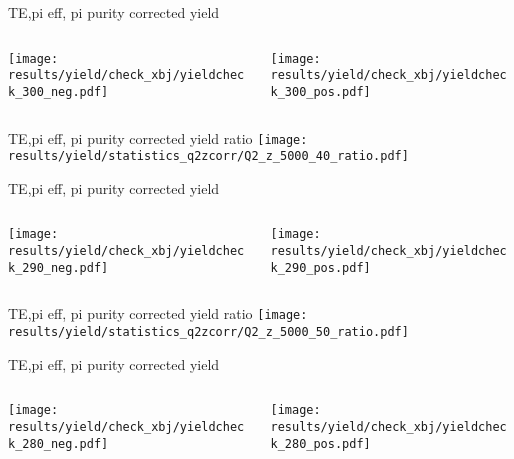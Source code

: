\begin{frame}{TE,pi eff, pi purity corrected yield}
\begin{columns}
\begin{column}[T]{0.5\textwidth}
\texttt{[image: results/yield/check\_xbj/yieldcheck\_300\_neg.pdf]}
\end{column}
\begin{column}[T]{0.5\textwidth}
\texttt{[image: results/yield/check\_xbj/yieldcheck\_300\_pos.pdf]}
\end{column}
\end{columns}
\end{frame}
\begin{frame}{TE,pi eff, pi purity corrected yield ratio}
\texttt{[image: results/yield/statistics\_q2zcorr/Q2\_z\_5000\_40\_ratio.pdf]}
\end{frame}
\begin{frame}{TE,pi eff, pi purity corrected yield}
\begin{columns}
\begin{column}[T]{0.5\textwidth}
\texttt{[image: results/yield/check\_xbj/yieldcheck\_290\_neg.pdf]}
\end{column}
\begin{column}[T]{0.5\textwidth}
\texttt{[image: results/yield/check\_xbj/yieldcheck\_290\_pos.pdf]}
\end{column}
\end{columns}
\end{frame}
\begin{frame}{TE,pi eff, pi purity corrected yield ratio}
\texttt{[image: results/yield/statistics\_q2zcorr/Q2\_z\_5000\_50\_ratio.pdf]}
\end{frame}
\begin{frame}{TE,pi eff, pi purity corrected yield}
\begin{columns}
\begin{column}[T]{0.5\textwidth}
\texttt{[image: results/yield/check\_xbj/yieldcheck\_280\_neg.pdf]}
\end{column}
\begin{column}[T]{0.5\textwidth}
\texttt{[image: results/yield/check\_xbj/yieldcheck\_280\_pos.pdf]}
\end{column}
\end{columns}
\end{frame}
